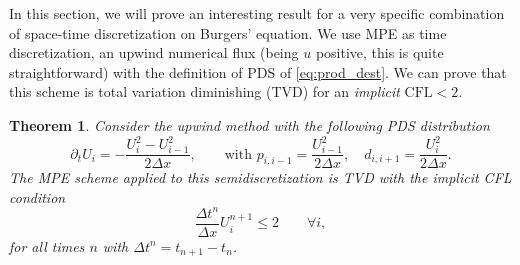 \documentclass[final,11pt, times, linenumber, nopreprintline]{elsarticle}
\newtheorem{thm}{Theorem}
\begin{document}
In this section, we will prove an interesting result for a very specific combination of space-time discretization on Burgers' equation. 
We use MPE as time discretization, an upwind numerical flux (being $u$ positive, this is quite straightforward) with the definition of PDS of \eqref{eq:prod_dest}. 
We can prove that this scheme is total variation diminishing (TVD) for an \textit{implicit} $\text{CFL} <2$.
\begin{thm}
	Consider the upwind method with the following PDS distribution
	\begin{equation}
		\partial_t U_i = - \frac{U_i^2-U_{i-1}^2}{2\Delta x}, \qquad \text{with } p_{i,i-1}=\frac{U_{i-1}^2}{2\Delta x}, \quad d_{i,i+1}=\frac{U_{i}^2}{2\Delta x}.
	\end{equation}
	The MPE scheme applied to this semidiscretization is TVD with the \textit{implicit }CFL condition
    \begin{equation}\label{eq:implicit_CFL}
        \frac{\Delta t^n}{\Delta x} U_i^{n+1} \leq 2 \qquad \forall i,
    \end{equation}
    for all times $n$ with $\Delta t ^n=t_{n+1}-t_n$.
\end{thm}
\end{document}
